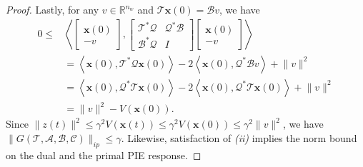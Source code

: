 \documentclass[10pt,a4paper]{amsart}
\newcommand{\R}{\mathbb{R}}
\newcommand{\bmat}[1]{\begin{bmatrix} #1 \end{bmatrix}}
\newcommand{\ip}[2]{\left\langle #1,#2\right\rangle}
\newcommand{\mbf}[1]{\mathbf{#1}}
\newcommand{\mcl}[1]{\mathcal{#1}}
\newcommand{\norm}[1]{\lVert#1\rVert}
\begin{document}
\begin{proof}
        Lastly, for any $v\in \R^{n_w}$ and $\mcl T\mbf x(0)=\mcl Bv$, we have
        \begin{align*}
            0\le &\ip{\bmat{\mbf x(0)\\-v}}{ \bmat{\mcl T^*\mcl Q&\mcl Q^*\mcl B\\\mcl B^*\mcl Q&I} \bmat{\mbf x(0)\\-v}} \\
            &= \ip{\mbf x(0)}{\mcl T^*\mcl Q\mbf x(0)} - 2\ip{\mbf x(0)}{\mcl Q^*\mcl Bv} + \norm{v}^2 \\
            &=\ip{\mbf x(0)}{\mcl Q^*\mcl T\mbf x(0)} - 2\ip{\mbf x(0)}{\mcl Q^*\mcl T\mbf x(0)} + \norm{v}^2 \\
            &= \norm{v}^2-V(\mbf x(0)).
        \end{align*}
        Since $\norm{z(t)}^2\le \gamma^2V(\mbf x(t))\le \gamma^2V(\mbf x(0))\le \gamma^2\norm{v}^2$, we have $\norm{G(\mcl T, \mcl A,\mcl B,\mcl C)}_{ip} \le \gamma$.
        Likewise, satisfaction of \textit{(ii)} implies the norm bound on the dual and the primal PIE response.
\end{proof}
\end{document}
